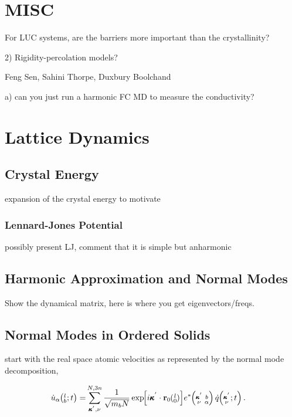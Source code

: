 \documentclass[letterpaper,12pt]{article}
\newcommand{\EXP}[1]{\exp\mspace{-5.0mu}\left[#1\right]\mspace{-3.0mu}}
\newcommand{\SUMprime}[2]{\ifthenelse{\equal{#1}{0}}{\sum_{\alpha_{#2},b_{#2},l_{#2}}^{3,n,N}} {\ifthenelse{\equal{#1}{1}}{\sum_{\alpha_{#2},b_{#2}}^{3,n}}{\sum_{\pmb{\kappa}^{'}#2,\nu#2}^{N,3n}}}}
\newcommand{\ab}[2]{\mspace{-4.0mu}\left(\mspace{-8.0mu}\begin{smallmatrix}&\ifthenelse{\equal{#1}{}}{a}{#1} \\&\ifthenelse{\equal{#2}{}}{b}{#2}\end{smallmatrix}\mspace{-3.0mu}\right)}
\newcommand{\kpvba}{\mspace{-4.0mu}\left(\mspace{-8.0mu}\begin{smallmatrix} &\pmb{\kappa}^{'} &b \\ &\nu &\alpha\end{smallmatrix}\mspace{-3.0mu}\right)}
\newcommand{\kpvt}{\mspace{-4.0mu}\left(\mspace{-8.0mu}\begin{smallmatrix}&\pmb{\kappa}^{'} \\&\nu\end{smallmatrix}\mspace{-2.0mu};t\right)}
\newcommand{\lbt}{\mspace{-4.0mu}\left(\mspace{-8.0mu}\begin{smallmatrix}&l \\&b\end{smallmatrix}\mspace{-2.0mu};t\right)}
\begin{document}
\section{\label{S-validation}MISC}

For LUC systems, are the barriers more important than the crystallinity?

2) Rigidity-percolation models?

Feng Sen, Sahini
Thorpe, Duxbury
Boolchand

a) can you just run a harmonic FC MD to measure the conductivity?



\appendix

\section*{Lattice Dynamics}

\subsection{\label{S-MD-SW}Crystal Energy}

expansion of the crystal energy to motivate

\subsubsection{\label{S-MD-SW}Lennard-Jones Potential}

possibly present LJ, comment that it is simple but anharmonic

\subsection{\label{S-MD-SW}Harmonic Approximation and Normal Modes}

Show the dynamical matrix, here is where you get eigenvectors/freqs.

\subsection{\label{S-Intro-Review}Normal Modes in Ordered Solids}

start with the real space atomic velocities as represented by the normal mode decomposition,

\cite{dove1993}
\begin{equation}\label{E:udot_HLD}
\begin{split}
\dot{u}_{\alpha}\lbt = &\SUMprime{2}{} \frac{1}{\sqrt{m_bN}} \EXP{i\pmb{\kappa}^{'}\cdot\mathbf{r}_0\ab{l}{0}} e^*\kpvba \dot{q}\kpvt{}{}{}.
\end{split}
\end{equation}
\end{document}
